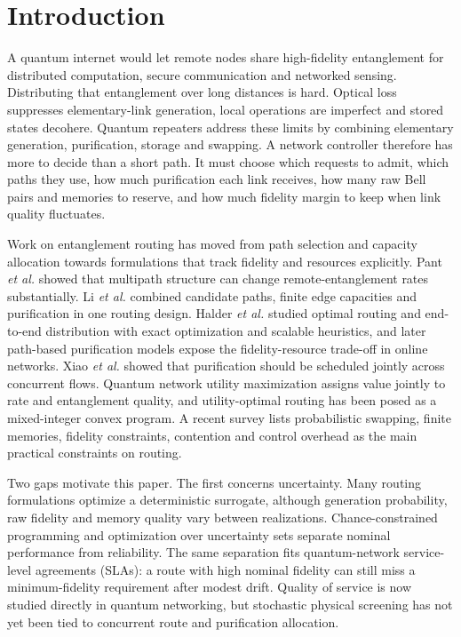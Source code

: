 \documentclass[pdflatex,sn-nature]{sn-jnl}
\theoremstyle{plain}
\theoremstyle{remark}
\begin{document}
\section{Introduction}\label{sec:intro}

A quantum internet would let remote nodes share high-fidelity entanglement for distributed computation, secure communication and networked sensing\cite{kimble2008,wehner2018,azuma2023}. Distributing that entanglement over long distances is hard. Optical loss suppresses elementary-link generation, local operations are imperfect and stored states decohere. Quantum repeaters address these limits by combining elementary generation, purification, storage and swapping\cite{briegel1998,dur1999,sangouard2011,azuma2023}. A network controller therefore has more to decide than a short path. It must choose which requests to admit, which paths they use, how much purification each link receives, how many raw Bell pairs and memories to reserve, and how much fidelity margin to keep when link quality fluctuates.

Work on entanglement routing has moved from path selection and capacity allocation towards formulations that track fidelity and resources explicitly. Pant \emph{et al.} showed that multipath structure can change remote-entanglement rates substantially\cite{pant2019}. Li \emph{et al.} combined candidate paths, finite edge capacities and purification in one routing design\cite{li2021}. Halder \emph{et al.} studied optimal routing and end-to-end distribution with exact optimization and scalable heuristics\cite{halder2024}, and later path-based purification models expose the fidelity-resource trade-off in online networks\cite{halder2026}. Xiao \emph{et al.} showed that purification should be scheduled jointly across concurrent flows\cite{xiao2024}. Quantum network utility maximization assigns value jointly to rate and entanglement quality\cite{vardoyan2023,kar2025}, and utility-optimal routing has been posed as a mixed-integer convex program\cite{kar2026}. A recent survey lists probabilistic swapping, finite memories, fidelity constraints, contention and control overhead as the main practical constraints on routing\cite{abane2025}.

Two gaps motivate this paper. The first concerns uncertainty. Many routing formulations optimize a deterministic surrogate, although generation probability, raw fidelity and memory quality vary between realizations. Chance-constrained programming and optimization over uncertainty sets separate nominal performance from reliability\cite{charnes1959,bertsimas2004}. The same separation fits quantum-network service-level agreements (SLAs): a route with high nominal fidelity can still miss a minimum-fidelity requirement after modest drift. Quality of service is now studied directly in quantum networking\cite{lopiparo2025}, but stochastic physical screening has not yet been tied to concurrent route and purification allocation.
\end{document}

